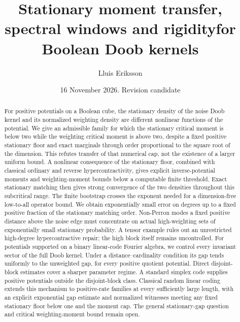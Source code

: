 \documentclass[11pt]{article}
\title{Stationary moment transfer, spectral windows and rigidity\newline for Boolean Doob kernels}
\author{Lluis Eriksson}
\date{16 November 2026. Revision candidate}
\begin{document}
\maketitle
\begin{abstract}
For positive potentials on a Boolean cube, the stationary density of the noise Doob kernel and its normalized weighting density are different nonlinear functions of the potential. We give an admissible family for which the stationary critical moment is below two while the weighting critical moment is above two, despite a fixed positive stationary floor and exact marginals through order proportional to the square root of the dimension. This refutes transfer of that numerical cap, not the existence of a larger uniform bound. A nonlinear consequence of the stationary floor, combined with classical ordinary and reverse hypercontractivity, gives explicit inverse-potential moments and weighting-moment bounds below a computable finite threshold. Exact stationary matching then gives strong convergence of the two densities throughout this subcritical range. The finite bootstrap crosses the exponent needed for a dimension-free low-to-all operator bound. We obtain exponentially small error on degrees up to a fixed positive fraction of the stationary matching order. Non-Perron modes a fixed positive distance above the noise edge must concentrate on actual high-weighting sets of exponentially small stationary probability. A tensor example rules out an unrestricted high-degree hypercontractive repair; the high block itself remains uncontrolled. For potentials supported on a binary linear-code Fourier algebra, we control every invariant sector of the full Doob kernel. Under a distance--cardinality condition its gap tends uniformly to the unweighted gap, for every positive quotient potential. Direct disjoint-block estimates cover a sharper parameter regime. A standard simplex code supplies positive potentials outside the disjoint-block class. Classical random linear coding extends this mechanism to positive-rate families at every sufficiently large length, with an explicit exponential gap estimate and normalized witnesses meeting any fixed stationary floor below one and the moment cap. The general stationary-gap question and critical weighting-moment bound remain open.
\end{abstract}
\end{document}

